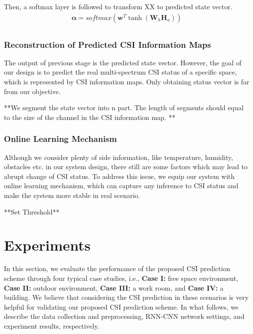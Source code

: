 \documentclass[10pt,journal,cspaper,compsoc]{IEEEtran}
\begin{document}
Then, a softmax layer is followed to transform XX to predicted state vector.
\begin{eqnarray}
	\mathbf{\alpha}  = softmax \left( {{\mathbf{w}^T}\tanh({\mathbf{W}_h}\mathbf{H}_a)} \right)\label{eq:9}\\
\end{eqnarray}

\subsubsection{Reconstruction of Predicted CSI Information Maps}
The output of previous stage is the predicted state vector. However, the goal of our design is to predict the real multi-spectrum CSI status of a specific space, which is represented by CSI information maps. Only obtaining status vector is far from our objective.

**We segment the state vector into n part. The length of segments should equal to the size of the channel in the CSI information map. **

\subsubsection{Online Learning Mechanism}
Although we consider plenty of side information, like temperature, humidity, obstacles etc. in our system design, there still are some factors which may lead to abrupt change of CSI status. To address this issue, we equip our system with online learning mechanism, which can capture any inference to CSI status and make the system more stable in real scenario.

**Set Threshold**





\section{Experiments}
\label{sec:exp-res}

In this section, we evaluate the performance of the proposed CSI prediction scheme through four typical case studies, i.e., \textbf{Case I:} free space environment, \textbf{Case II:} outdoor environment, \textbf{Case III:} a work room, and \textbf{Case IV:} a building. We believe that considering the CSI prediction in these scenarios is very helpful for validating our proposed CSI prediction scheme. In what follows, we describe the data collection and preprocessing, RNN-CNN network settings, and experiment results, respectively.
\end{document}
